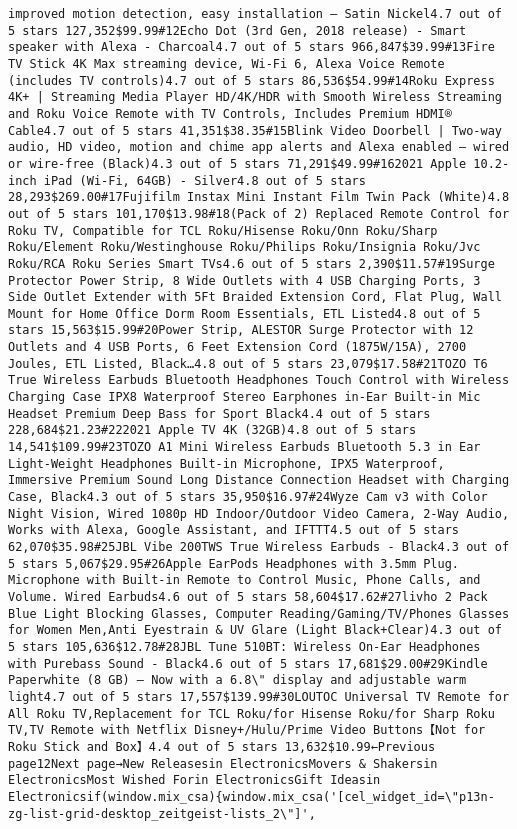 \documentclass[
]{article}
\begin{document}
\begin{verbatim}
improved motion detection, easy installation – Satin Nickel4.7 out of 5 stars 127,352$99.99#12Echo Dot (3rd Gen, 2018 release) - Smart speaker with Alexa - Charcoal4.7 out of 5 stars 966,847$39.99#13Fire TV Stick 4K Max streaming device, Wi-Fi 6, Alexa Voice Remote (includes TV controls)4.7 out of 5 stars 86,536$54.99#14Roku Express 4K+ | Streaming Media Player HD/4K/HDR with Smooth Wireless Streaming and Roku Voice Remote with TV Controls, Includes Premium HDMI® Cable4.7 out of 5 stars 41,351$38.35#15Blink Video Doorbell | Two-way audio, HD video, motion and chime app alerts and Alexa enabled — wired or wire-free (Black)4.3 out of 5 stars 71,291$49.99#162021 Apple 10.2-inch iPad (Wi-Fi, 64GB) - Silver4.8 out of 5 stars 28,293$269.00#17Fujifilm Instax Mini Instant Film Twin Pack (White)4.8 out of 5 stars 101,170$13.98#18(Pack of 2) Replaced Remote Control for Roku TV, Compatible for TCL Roku/Hisense Roku/Onn Roku/Sharp Roku/Element Roku/Westinghouse Roku/Philips Roku/Insignia Roku/Jvc Roku/RCA Roku Series Smart TVs4.6 out of 5 stars 2,390$11.57#19Surge Protector Power Strip, 8 Wide Outlets with 4 USB Charging Ports, 3 Side Outlet Extender with 5Ft Braided Extension Cord, Flat Plug, Wall Mount for Home Office Dorm Room Essentials, ETL Listed4.8 out of 5 stars 15,563$15.99#20Power Strip, ALESTOR Surge Protector with 12 Outlets and 4 USB Ports, 6 Feet Extension Cord (1875W/15A), 2700 Joules, ETL Listed, Black…4.8 out of 5 stars 23,079$17.58#21TOZO T6 True Wireless Earbuds Bluetooth Headphones Touch Control with Wireless Charging Case IPX8 Waterproof Stereo Earphones in-Ear Built-in Mic Headset Premium Deep Bass for Sport Black4.4 out of 5 stars 228,684$21.23#222021 Apple TV 4K (32GB)4.8 out of 5 stars 14,541$109.99#23TOZO A1 Mini Wireless Earbuds Bluetooth 5.3 in Ear Light-Weight Headphones Built-in Microphone, IPX5 Waterproof, Immersive Premium Sound Long Distance Connection Headset with Charging Case, Black4.3 out of 5 stars 35,950$16.97#24Wyze Cam v3 with Color Night Vision, Wired 1080p HD Indoor/Outdoor Video Camera, 2-Way Audio, Works with Alexa, Google Assistant, and IFTTT4.5 out of 5 stars 62,070$35.98#25JBL Vibe 200TWS True Wireless Earbuds - Black4.3 out of 5 stars 5,067$29.95#26Apple EarPods Headphones with 3.5mm Plug. Microphone with Built-in Remote to Control Music, Phone Calls, and Volume. Wired Earbuds4.6 out of 5 stars 58,604$17.62#27livho 2 Pack Blue Light Blocking Glasses, Computer Reading/Gaming/TV/Phones Glasses for Women Men,Anti Eyestrain & UV Glare (Light Black+Clear)4.3 out of 5 stars 105,636$12.78#28JBL Tune 510BT: Wireless On-Ear Headphones with Purebass Sound - Black4.6 out of 5 stars 17,681$29.00#29Kindle Paperwhite (8 GB) – Now with a 6.8\" display and adjustable warm light4.7 out of 5 stars 17,557$139.99#30LOUTOC Universal TV Remote for All Roku TV,Replacement for TCL Roku/for Hisense Roku/for Sharp Roku TV,TV Remote with Netflix Disney+/Hulu/Prime Video Buttons【Not for Roku Stick and Box】4.4 out of 5 stars 13,632$10.99←Previous page12Next page→New Releasesin ElectronicsMovers & Shakersin ElectronicsMost Wished Forin ElectronicsGift Ideasin Electronicsif(window.mix_csa){window.mix_csa('[cel_widget_id=\"p13n-zg-list-grid-desktop_zeitgeist-lists_2\"]', 
\end{verbatim}
\end{document}
